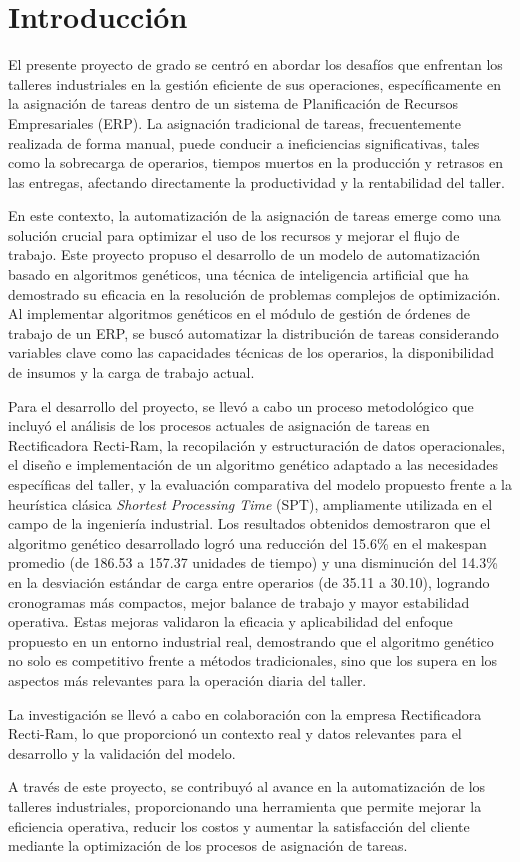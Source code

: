 \chapter{Introducción}

El presente proyecto de grado se centró en abordar los desafíos que enfrentan los talleres industriales en la gestión eficiente de sus operaciones, específicamente en la asignación de tareas dentro de un sistema de Planificación de Recursos Empresariales (ERP). La asignación tradicional de tareas, frecuentemente realizada de forma manual, puede conducir a ineficiencias significativas, tales como la sobrecarga de operarios, tiempos muertos en la producción y retrasos en las entregas, afectando directamente la productividad y la rentabilidad del taller.

En este contexto, la automatización de la asignación de tareas emerge como una solución crucial para optimizar el uso de los recursos y mejorar el flujo de trabajo. Este proyecto propuso el desarrollo de un modelo de automatización basado en algoritmos genéticos, una técnica de inteligencia artificial que ha demostrado su eficacia en la resolución de problemas complejos de optimización. Al implementar algoritmos genéticos en el módulo de gestión de órdenes de trabajo de un ERP, se buscó automatizar la distribución de tareas considerando variables clave como las capacidades técnicas de los operarios, la disponibilidad de insumos y la carga de trabajo actual.

Para el desarrollo del proyecto, se llevó a cabo un proceso metodológico que incluyó el análisis de los procesos actuales de asignación de tareas en Rectificadora Recti-Ram, la recopilación y estructuración de datos operacionales, el diseño e implementación de un algoritmo genético adaptado a las necesidades específicas del taller, y la evaluación comparativa del modelo propuesto frente a la heurística clásica \textit{Shortest Processing Time} (SPT), ampliamente utilizada en el campo de la ingeniería industrial. Los resultados obtenidos demostraron que el algoritmo genético desarrollado logró una reducción del 15.6\% en el makespan promedio (de 186.53 a 157.37 unidades de tiempo) y una disminución del 14.3\% en la desviación estándar de carga entre operarios (de 35.11 a 30.10), logrando cronogramas más compactos, mejor balance de trabajo y mayor estabilidad operativa. Estas mejoras validaron la eficacia y aplicabilidad del enfoque propuesto en un entorno industrial real, demostrando que el algoritmo genético no solo es competitivo frente a métodos tradicionales, sino que los supera en los aspectos más relevantes para la operación diaria del taller.

La investigación se llevó a cabo en colaboración con la empresa Rectificadora Recti-Ram, lo que proporcionó un contexto real y datos relevantes para el desarrollo y la validación del modelo.

A través de este proyecto, se contribuyó al avance en la automatización de los talleres industriales, proporcionando una herramienta que permite mejorar la eficiencia operativa, reducir los costos y aumentar la satisfacción del cliente mediante la optimización de los procesos de asignación de tareas.